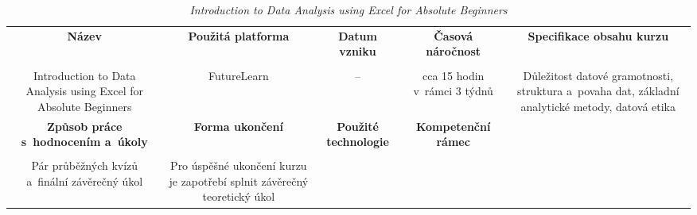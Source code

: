\begin{landscape}

\begin{table}[htbp]

\renewcommand\thetable{9}

\caption{\textit{Introduction to Data Analysis using Excel for Absolute Beginners}}\label{tab8}

\footnotesize

{

\justifying

\begin{tabularx}{\linewidth}{CCCCC}

\toprule

\textbf{Název} &

\textbf{Použitá platforma} &

\textbf{Datum vzniku} &

\textbf{Časová náročnost} &
 
\textbf{Specifikace obsahu kurzu}

\\

\tabularnewline
\midrule

Introduction to Data Analysis using Excel for Absolute Beginners

&

FutureLearn

&

–

&

cca 15 hodin v~rámci 3 týdnů

&

Důležitost datové gramotnosti, struktura a~povaha dat, základní analytické metody, datová etika

\\
\toprule

\textbf{Způsob práce s~hodnocením a~úkoly} &

\textbf{Forma ukončení} &

\textbf{Použité technologie} &

\textbf{Kompetenční rámec} 

\\

\tabularnewline
\midrule

Pár průběžných kvízů a~finální závěrečný úkol    

&

Pro úspěšné ukončení kurzu je zapotřebí splnit závěrečný teoretický úkol

&


\end{tabularx}}
\end{table}
\end{landscape}
